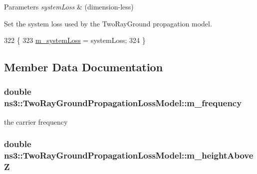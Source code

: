 \begin{DoxyParams}{Parameters}
{\em system\+Loss} & (dimension-\/less)\\
\hline
\end{DoxyParams}
Set the system loss used by the Two\+Ray\+Ground propagation model. 
\begin{DoxyCode}
322 \{
323   \hyperlink{classns3_1_1TwoRayGroundPropagationLossModel_a944fc5bdc91fb21e200374a5f415d826}{m\_systemLoss} = systemLoss;
324 \}
\end{DoxyCode}


\subsection{Member Data Documentation}
\subsubsection[{\texorpdfstring{m\+\_\+frequency}{m_frequency}}]{\setlength{\rightskip}{0pt plus 5cm}double ns3\+::\+Two\+Ray\+Ground\+Propagation\+Loss\+Model\+::m\+\_\+frequency\hspace{0.3cm}{\ttfamily [private]}}\hypertarget{classns3_1_1TwoRayGroundPropagationLossModel_ae83dd1e9c0cccc220a3f04b81194221a}{}\label{classns3_1_1TwoRayGroundPropagationLossModel_ae83dd1e9c0cccc220a3f04b81194221a}


the carrier frequency 

\subsubsection[{\texorpdfstring{m\+\_\+height\+AboveZ}{m_heightAboveZ}}]{\setlength{\rightskip}{0pt plus 5cm}double ns3\+::\+Two\+Ray\+Ground\+Propagation\+Loss\+Model\+::m\+\_\+height\+AboveZ\hspace{0.3cm}{\ttfamily [private]}}\hypertarget{classns3_1_1TwoRayGroundPropagationLossModel_a3b383aac3f7bf082f1bb15ca6b1efd3f}{}\label{classns3_1_1TwoRayGroundPropagationLossModel_a3b383aac3f7bf082f1bb15ca6b1efd3f}


